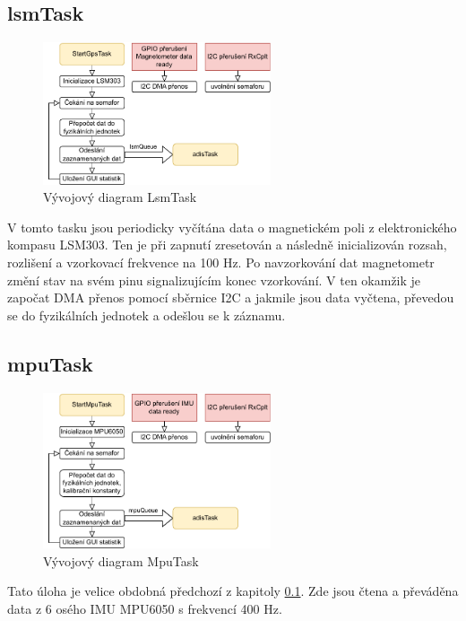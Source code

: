 \subsection{lsmTask} \label{lsmTask}
\begin{figure}[h]
    \centering
    \includegraphics[width=0.6\textwidth]{obrazky/LsmTask}
    \caption{Vývojový diagram LsmTask}
\end{figure}
V tomto tasku jsou periodicky vyčítána data o magnetickém poli z elektronického kompasu LSM303. Ten je při zapnutí zresetován a následně inicializován rozsah, rozlišení a vzorkovací frekvence na 100 Hz. Po navzorkování dat magnetometr změní stav na svém pinu signalizujícím konec vzorkování. V ten okamžik je započat DMA přenos pomocí sběrnice I2C a jakmile jsou data vyčtena, převedou se do fyzikálních jednotek a odešlou se k záznamu.

\subsection{mpuTask}
\begin{figure}[h]
    \centering
    \includegraphics[width=0.6\textwidth]{obrazky/MpuTask}
    \caption{Vývojový diagram MpuTask}
\end{figure}
Tato úloha je velice obdobná předchozí z kapitoly \ref{lsmTask}. Zde jsou čtena a převáděna data z 6 osého IMU MPU6050 s frekvencí 400 Hz.

